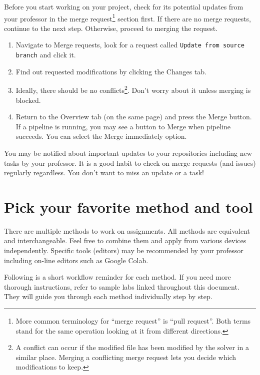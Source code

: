 {Before you start working on your project, check for its potential updates from your professor in the merge request\footnote{More common terminology for “merge request” is “pull request”. Both terms stand for the same operation looking at it from different directions.} section first. If there are no merge requests, continue to the next step. Otherwise, proceed to merging the request.}

\begin{enumerate}
\item
  {Navigate to Merge requests, look for a request called \texttt{Update from source branch} and click it.}
\item
  {Find out requested modifications by clicking the Changes tab.}
\item
  {Ideally, there should be no conflicts\footnote{A conflict can occur if the modified file has been modified by the solver in a similar place. Merging a conflicting merge request lets you decide which modifications to keep.}. Don't worry about it unless merging is blocked.}
\item
  {Return to the Overview tab (on the same page) and press the Merge button. If a pipeline is running, you may see a button to Merge when pipeline succeeds. You can select the Merge immediately option.}
\end{enumerate}

{You may be notified about important updates to your repositories including new tasks by your professor. It is a good habit to check on merge requests (and issues) regularly regardless. You don't want to miss an update or a task!}

\section{Pick your favorite method and tool}\label{sec:pick}

{There are multiple methods to work on assignments. All methods are equivalent and interchangeable. Feel free to combine them and apply from various devices independently. Specific tools (editors) may be recommended by your professor including on-line editors such as Google Colab.}

{Following is a short workflow reminder for each method. If you need more thorough instructions, refer to sample labs linked throughout this document. They will guide you through each method individually step by step.}

